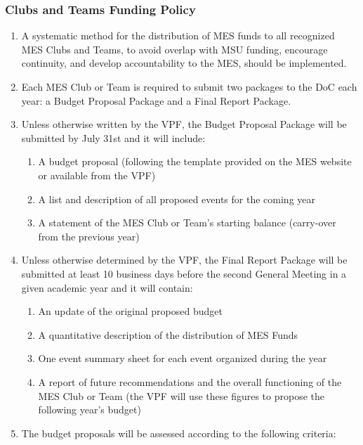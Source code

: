 \subsubsection{Clubs and Teams Funding Policy}
\label{clubs-and-teams-funding-policy}
\begin{enumerate}
 \item
  A systematic method for the distribution of MES funds to all recognized MES Clubs and Teams, to avoid overlap with MSU funding, encourage continuity, and develop accountability to the MES, should be implemented.
 \item
  Each MES Club or Team is required to submit two packages to the DoC each year: a Budget Proposal Package and a Final Report Package.
 \item
  Unless otherwise written by the VPF, the Budget Proposal Package will be submitted by July 31st and it will include:

  \begin{enumerate}
   \item
    A budget proposal (following the template provided on the MES website or available from the VPF)
   \item
    A list and description of all proposed events for the coming year
   \item
    A statement of the MES Club or Team's starting balance (carry-over from the previous year)
  \end{enumerate}
 \item
  Unless otherwise determined by the VPF, the Final Report Package will be submitted at least 10 business days before the second General Meeting in a given academic year and it will contain:

  \begin{enumerate}
   \item
    An update of the original proposed budget
   \item
    A quantitative description of the distribution of MES Funds
   \item
    One event summary sheet for each event organized during the year
   \item
    A report of future recommendations and the overall functioning of the MES Club or Team (the VPF will use these figures to propose the following year's budget)
  \end{enumerate}
 \item
  The budget proposals will be assessed according to the following criteria:


\end{enumerate}
